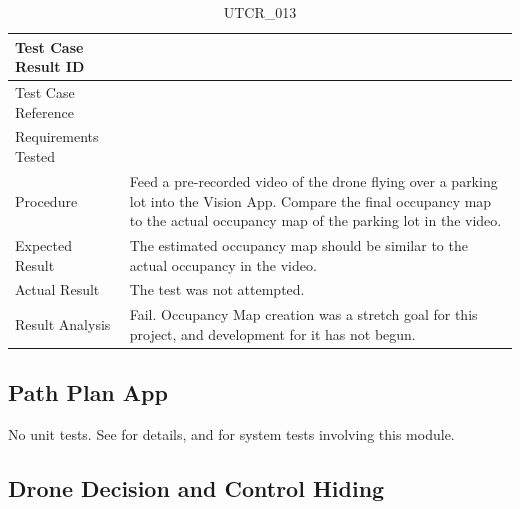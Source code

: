 \documentclass[12pt, titlepage]{article}
\begin{document}
\begin{table}[!h]
\begin{center}
\caption {UTCR\_013}
\label{tab:UTCR_013}
\begin{tabular}{ | m{3.2cm} | m{12.2cm} | } 
\hline
Test Case Result ID & \nameref{tab:UTCR_013} \\ 
\hline
Test Case Reference & \nameref{tab:UTC_013}  \\ 
\hline
Requirements Tested & \nameref{GEN_002}\\ 
\hline
Procedure &  Feed a pre-recorded video of the drone flying over a parking lot into the Vision App. Compare the final occupancy map to the actual occupancy map of the parking lot in the video.\\ 
\hline
Expected Result & The estimated occupancy map should be similar to the actual occupancy in the video. \\ 
\hline
Actual Result & The test was not attempted. \\ 
\hline
Result Analysis & Fail. Occupancy Map creation was a stretch goal for this project, and development for it has not begun. \\ 
\hline
\end{tabular}
\end{center}
\end{table}

\clearpage

\subsection{Path Plan App}
\label{subsec:pathPlanApp}

No unit tests. See  for details, and  for system tests involving this module.

\subsection{Drone Decision and Control Hiding}
\label{subsec:ddcHiding}
\end{document}

